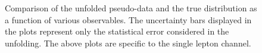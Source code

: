 \begin{figure}[ht]
  \quad\quad
  \quad\quad
  \caption{Comparison of the unfolded pseudo-data and the true distribution as a function of various observables. The uncertainty bars displayed in the plots represent only the statistical error considered in the unfolding. The above plots are specific to the single lepton channel.}
  \label{fig:unfolded_ljet_dist_closure}
\end{figure}
\FloatBarrier


